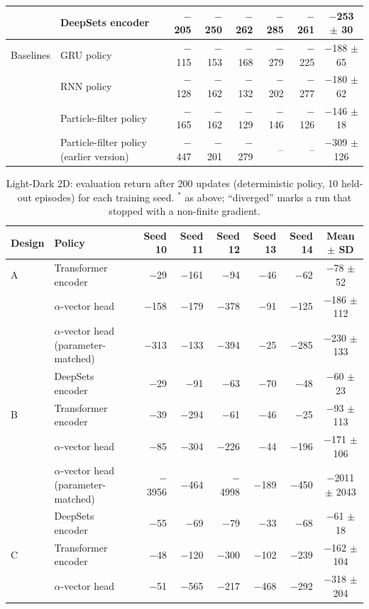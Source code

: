 \documentclass[11pt]{article}
\begin{document}
\begin{table}[htbp]
\begin{tabular}{llrrrrrc}
 & DeepSets encoder & $-$205 & $-$250 & $-$262 & $-$285 & $-$261 & $-$253 $\pm$ 30 \\
\midrule
Baselines & GRU policy & $-$115 & $-$153 & $-$168 & $-$279 & $-$225 & $-$188 $\pm$ 65 \\
 & RNN policy & $-$128 & $-$162 & $-$132 & $-$202 & $-$277 & $-$180 $\pm$ 62 \\
 & Particle-filter policy & $-$165 & $-$162 & $-$129 & $-$146 & $-$126 & $-$146 $\pm$ 18 \\
 & Particle-filter policy (earlier version) & $-$447 & $-$201 & $-$279 & -- & -- & $-$309 $\pm$ 126 \\
\bottomrule
\end{tabular}
\end{table}

\begin{table}[htbp]
\centering
\footnotesize
\caption{Light-Dark 2D: evaluation return after 200 updates (deterministic policy, 10 held-out episodes) for each training seed. $^{*}$ as above; ``diverged'' marks a run that stopped with a non-finite gradient.}
\label{tab:ld2d-final}
\begin{tabular}{llrrrrrc}
\toprule
Design & Policy & Seed 10 & Seed 11 & Seed 12 & Seed 13 & Seed 14 & Mean $\pm$ SD \\
\midrule
A & Transformer encoder & $-$29 & $-$161 & $-$94 & $-$46 & $-$62 & $-$78 $\pm$ 52 \\
 & $\alpha$-vector head & $-$158 & $-$179 & $-$378 & $-$91 & $-$125 & $-$186 $\pm$ 112 \\
 & $\alpha$-vector head (parameter-matched) & $-$313 & $-$133 & $-$394 & $-$25 & $-$285 & $-$230 $\pm$ 133 \\
 & DeepSets encoder & $-$29 & $-$91 & $-$63 & $-$70 & $-$48 & $-$60 $\pm$ 23 \\
\midrule
B & Transformer encoder & $-$39 & $-$294 & $-$61 & $-$46 & $-$25 & $-$93 $\pm$ 113 \\
 & $\alpha$-vector head & $-$85 & $-$304 & $-$226 & $-$44 & $-$196 & $-$171 $\pm$ 106 \\
 & $\alpha$-vector head (parameter-matched) & $-$3956 & $-$464 & $-$4998 & $-$189 & $-$450 & $-$2011 $\pm$ 2043 \\
 & DeepSets encoder & $-$55 & $-$69 & $-$79 & $-$33 & $-$68 & $-$61 $\pm$ 18 \\
\midrule
C & Transformer encoder & $-$48 & $-$120 & $-$300 & $-$102 & $-$239 & $-$162 $\pm$ 104 \\
 & $\alpha$-vector head & $-$51 & $-$565 & $-$217 & $-$468 & $-$292 & $-$318 $\pm$ 204 \\

\end{tabular}
\end{table}
\end{document}
